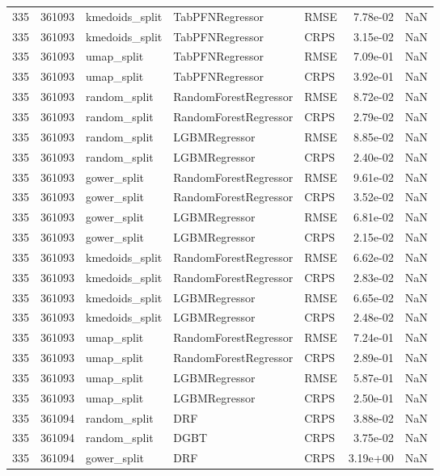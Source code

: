 \begin{tabular}{rrlllrr}
335 & 361093 & kmedoids\_split & TabPFNRegressor & RMSE & 7.78e-02 & NaN \\
335 & 361093 & kmedoids\_split & TabPFNRegressor & CRPS & 3.15e-02 & NaN \\
335 & 361093 & umap\_split & TabPFNRegressor & RMSE & 7.09e-01 & NaN \\
335 & 361093 & umap\_split & TabPFNRegressor & CRPS & 3.92e-01 & NaN \\
335 & 361093 & random\_split & RandomForestRegressor & RMSE & 8.72e-02 & NaN \\
335 & 361093 & random\_split & RandomForestRegressor & CRPS & 2.79e-02 & NaN \\
335 & 361093 & random\_split & LGBMRegressor & RMSE & 8.85e-02 & NaN \\
335 & 361093 & random\_split & LGBMRegressor & CRPS & 2.40e-02 & NaN \\
335 & 361093 & gower\_split & RandomForestRegressor & RMSE & 9.61e-02 & NaN \\
335 & 361093 & gower\_split & RandomForestRegressor & CRPS & 3.52e-02 & NaN \\
335 & 361093 & gower\_split & LGBMRegressor & RMSE & 6.81e-02 & NaN \\
335 & 361093 & gower\_split & LGBMRegressor & CRPS & 2.15e-02 & NaN \\
335 & 361093 & kmedoids\_split & RandomForestRegressor & RMSE & 6.62e-02 & NaN \\
335 & 361093 & kmedoids\_split & RandomForestRegressor & CRPS & 2.83e-02 & NaN \\
335 & 361093 & kmedoids\_split & LGBMRegressor & RMSE & 6.65e-02 & NaN \\
335 & 361093 & kmedoids\_split & LGBMRegressor & CRPS & 2.48e-02 & NaN \\
335 & 361093 & umap\_split & RandomForestRegressor & RMSE & 7.24e-01 & NaN \\
335 & 361093 & umap\_split & RandomForestRegressor & CRPS & 2.89e-01 & NaN \\
335 & 361093 & umap\_split & LGBMRegressor & RMSE & 5.87e-01 & NaN \\
335 & 361093 & umap\_split & LGBMRegressor & CRPS & 2.50e-01 & NaN \\
335 & 361094 & random\_split & DRF & CRPS & 3.88e-02 & NaN \\
335 & 361094 & random\_split & DGBT & CRPS & 3.75e-02 & NaN \\
335 & 361094 & gower\_split & DRF & CRPS & 3.19e+00 & NaN \\

\end{tabular}
